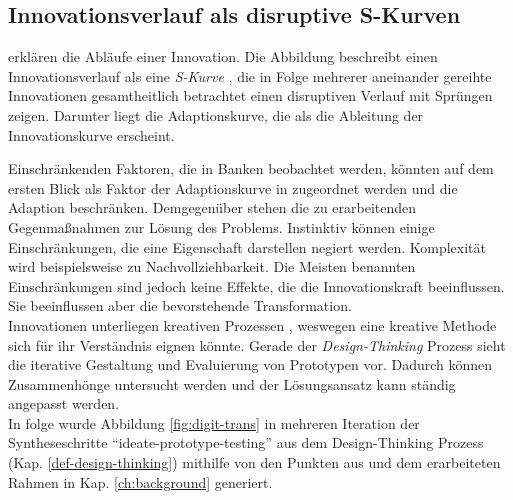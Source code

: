 \subsection{Innovationsverlauf als disruptive S-Kurven}
\citet[Kap. 2.2]{Alt2017} erklären die Abläufe einer Innovation. Die Abbildung \cite[Abb. 2.1]{Alt2017} beschreibt einen Innovationsverlauf als eine \emph{S-Kurve} \cite{Ganswindt2006}, die in Folge mehrerer aneinander gereihte Innovationen gesamtheitlich betrachtet einen disruptiven Verlauf mit Sprüngen zeigen. Darunter liegt die Adaptionskurve, die als die Ableitung der Innovationskurve erscheint. 

Einschränkenden Faktoren, die in Banken beobachtet werden, könnten auf dem ersten Blick als Faktor der Adaptionskurve in \cite[Abb. 2.1]{Alt2017} zugeordnet werden und die Adaption beschränken. Demgegenüber stehen die zu erarbeitenden Gegenmaßnahmen zur Lösung des Problems. Instinktiv können einige Einschränkungen, die eine Eigenschaft darstellen negiert werden. Komplexität wird beispielsweise zu Nachvollziehbarkeit. Die Meisten benannten Einschränkungen sind jedoch keine Effekte, die die Innovationskraft beeinflussen. Sie beeinflussen aber die bevorstehende Transformation. 
\medskip
\\
Innovationen unterliegen kreativen Prozessen \cite[S.14]{Alt2017}, weswegen eine kreative Methode sich für ihr Verständnis eignen könnte. Gerade der \emph{Design-Thinking} Prozess sieht die iterative Gestaltung und Evaluierung von Prototypen vor. Dadurch können Zusammenhönge untersucht werden und der Lösungsansatz kann ständig angepasst werden.
\medskip
\\
In folge wurde Abbildung \ref{fig:digit-trans} in mehreren Iteration der Syntheseschritte \enquote{ideate-prototype-testing} aus dem Design-Thinking Prozess (Kap. \ref{def-design-thinking}) mithilfe von den Punkten aus \cite[S. 14]{Alt2017} und dem erarbeiteten Rahmen in Kap. \ref{ch:background} generiert.
%


